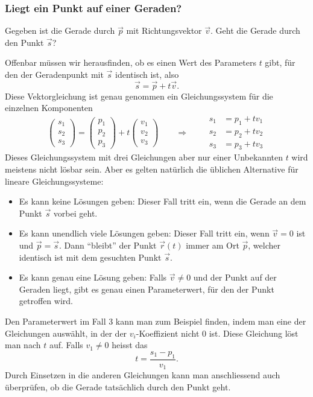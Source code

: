 \subsubsection{Liegt ein Punkt auf einer Geraden?}
\begin{aufgabe}
Gegeben ist die Gerade durch $\vec p$ mit Richtungsvektor $\vec v$.
Geht die
Gerade durch den Punkt $\vec s$?
\end{aufgabe}
Offenbar müssen wir herausfinden, ob es
einen Wert des Parameters $t$ gibt, für den der Geradenpunkt mit $\vec s$
identisch ist, also
\[
\vec s = \vec p + t\vec v.
\]
Diese Vektorgleichung ist genau genommen ein Gleichungssystem für die einzelnen
Komponenten
\[
\begin{pmatrix}
s_1\\s_2\\s_3
\end{pmatrix}
=
\begin{pmatrix}
p_1\\p_2\\p_3
\end{pmatrix}
+t
\begin{pmatrix}
v_1\\v_2\\v_3
\end{pmatrix}
\qquad
\Rightarrow
\qquad
\begin{aligned}
s_1&=p_1+tv_1\\
s_2&=p_2+tv_2\\
s_3&=p_3+tv_3
\end{aligned}
\]
Dieses Gleichungssystem mit drei Gleichungen aber nur einer Unbekannten $t$
wird meistens nicht lösbar sein.
Aber es gelten natürlich die üblichen Alternative
für lineare Gleichungssysteme:
\begin{itemize}
\item Es kann keine Lösungen geben: Dieser Fall tritt ein, wenn die Gerade
an dem Punkt $\vec{s}$ vorbei geht.
\item Es kann unendlich viele Lösungen geben: Dieser Fall tritt ein, wenn
$\vec v=0$ ist und $\vec p=\vec s$.
Dann ``bleibt'' der Punkt $\vec r(t)$
immer am Ort $\vec p$, welcher identisch ist mit dem gesuchten Punkt $\vec s$.
\item Es kann genau eine Lösung geben: Falls $\vec v\ne 0$ und der Punkt auf der
Geraden liegt, gibt es genau einen Parameterwert, für den der Punkt
getroffen wird.
\end{itemize}
Den Parameterwert im Fall 3 kann man zum Beispiel finden, indem man eine
der Gleichungen auswählt, in der der $v_i$-Koeffizient nicht $0$ ist.
Diese Gleichung löst man nach $t$ auf.
Falls $v_1\ne 0$ heisst das
\[
t=\frac{s_1-p_1}{v_1}.
\]
Durch Einsetzen in die anderen Gleichungen kann man anschliessend auch überprüfen,
ob die Gerade tatsächlich durch den Punkt geht.

